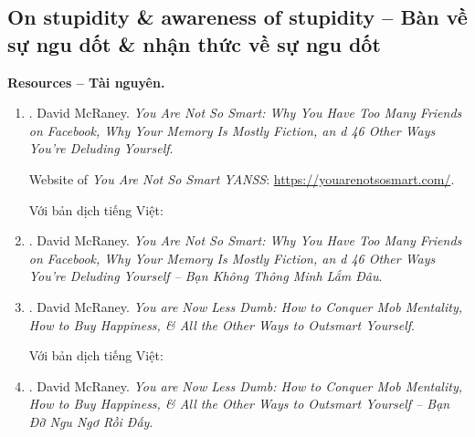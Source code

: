\documentclass[12pt]{article}
\begin{document}
\subsection{On stupidity \& awareness of stupidity -- Bàn về sự ngu dốt \& nhận thức về sự ngu dốt}
\textbf{\textsf{Resources -- Tài nguyên.}}
\begin{enumerate}
	\item \cite{McRaney_not_smart}. {\sc David McRaney}. {\it You Are Not So Smart: Why You Have Too Many Friends on Facebook, Why Your Memory Is Mostly Fiction, an d 46 Other Ways You're Deluding Yourself}.
	
	Website of {\it You Are Not So Smart YANSS}: \url{https://youarenotsosmart.com/}.
	
	Với bản dịch tiếng Việt:
	\item \cite{McRaney_not_smart_VN}. {\sc David McRaney}. {\it You Are Not So Smart: Why You Have Too Many Friends on Facebook, Why Your Memory Is Mostly Fiction, an d 46 Other Ways You're Deluding Yourself -- Bạn Không Thông Minh Lắm Đâu}.
	\item \cite{McRaney_less_stupid}. {\sc David McRaney}. {\it You are Now Less Dumb: How to Conquer Mob Mentality, How to Buy Happiness, \& All the Other Ways to Outsmart Yourself}.
	
	Với bản dịch tiếng Việt:
	\item \cite{McRaney_not_smart_VN}. {\sc David McRaney}. {\it You are Now Less Dumb: How to Conquer Mob Mentality, How to Buy Happiness, \& All the Other Ways to Outsmart Yourself -- Bạn Đỡ Ngu Ngơ Rồi Đấy}.
\end{enumerate}
\end{document}
